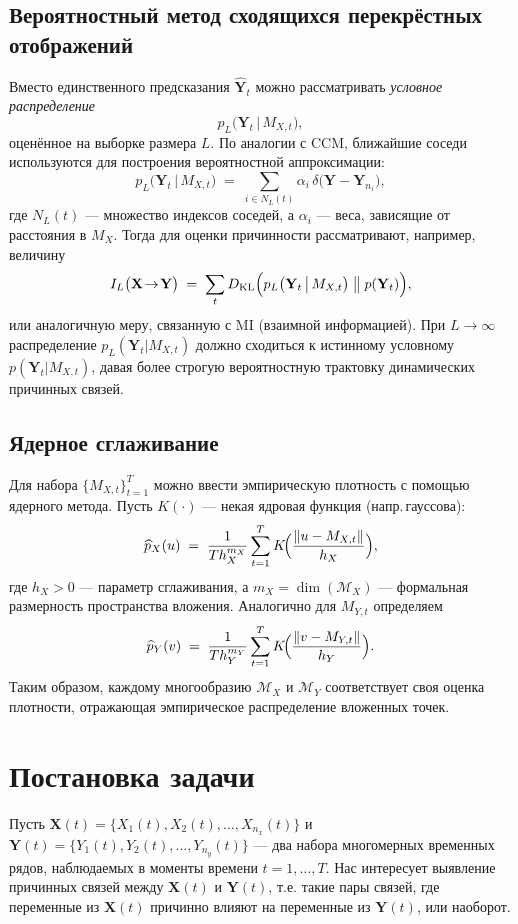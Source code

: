 \documentclass[a4paper, 12pt]{article}
\begin{document}
	\subsection{Вероятностный метод сходящихся перекрёстных отображений}
	
	Вместо единственного предсказания $\widehat{\mathbf{Y}}_t$ можно рассматривать \emph{условное распределение} 
	\[
	p_L\bigl(\mathbf{Y}_t \,\big\vert\, M_{X,t}\bigr),
	\]
	оценённое на выборке размера $L$. По аналогии с CCM, ближайшие соседи используются для построения вероятностной аппроксимации:
	\[
	p_L\bigl(\mathbf{Y}_t \,\big\vert\, M_{X,t}\bigr)
	\;=\;
	\sum_{i\in N_L(t)} \alpha_i \,\delta\bigl(\mathbf{Y}-\mathbf{Y}_{n_i}\bigr),
	\]
	где $N_L(t)$ --- множество индексов соседей, а $\alpha_i$ --- веса, зависящие от расстояния в $M_X$. Тогда для оценки причинности рассматривают, например, величину
	\[
	I_L\bigl(\mathbf{X}\!\to\!\mathbf{Y}\bigr)
	\;=\;
	\sum_{t}
	D_{\mathrm{KL}}\Bigl(
	p_L\bigl(\mathbf{Y}_t \,\big\vert\, M_{X,t}\bigr) 
	\;\big\|\;
	p(\mathbf{Y}_t)
	\Bigr),
	\]
	или аналогичную меру, связанную с \(\mathrm{MI}\) (взаимной информацией). При $L\to\infty$ распределение $p_L(\mathbf{Y}_t|M_{X,t})$ должно сходиться к истинному условному $p(\mathbf{Y}_t|M_{X,t})$, давая более строгую вероятностную трактовку динамических причинных связей.
	
	\subsection{Ядерное сглаживание}
	
	Для набора $\{M_{X,t}\}_{t=1}^T$ можно ввести эмпирическую плотность с помощью ядерного метода. Пусть $K(\cdot)$ --- некая ядровая функция (напр.\,гауссова):
	\[
	\widehat{p}_X(u)
	\;=\;
	\frac{1}{T h_X^{m_X}}
	\sum_{t=1}^T
	K\!\Bigl(\frac{\|u - M_{X,t}\|}{h_X}\Bigr),
	\]
	где $h_X>0$ --- параметр сглаживания, а $m_X=\dim(\mathcal{M}_X)$ --- формальная размерность пространства вложения. Аналогично для $M_{Y,t}$ определяем
	\[
	\widehat{p}_Y(v)
	\;=\;
	\frac{1}{T h_Y^{m_Y}}
	\sum_{t=1}^T
	K\!\Bigl(\frac{\|v - M_{Y,t}\|}{h_Y}\Bigr).
	\]
	Таким образом, каждому многообразию $\mathcal{M}_X$ и $\mathcal{M}_Y$ соответствует своя оценка плотности, отражающая эмпирическое распределение вложенных точек.
	
	\section{Постановка задачи}
	
	Пусть \( \mathbf{X}(t) = \{X_1(t), X_2(t), \ldots, X_{n_x}(t)\} \) и \( \mathbf{Y}(t) = \{Y_1(t), Y_2(t), \ldots, Y_{n_y}(t)\} \) — два набора многомерных временных рядов, наблюдаемых в моменты времени \( t = 1, \ldots, T \). Нас интересует выявление причинных связей между \( \mathbf{X}(t) \) и \( \mathbf{Y}(t) \), т.е. такие пары связей, где переменные из \( \mathbf{X}(t) \) причинно влияют на переменные из \( \mathbf{Y}(t) \), или наоборот.
	
\end{document}
